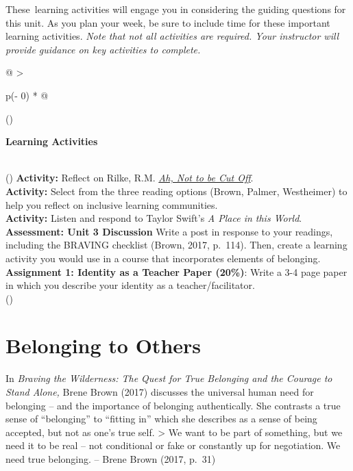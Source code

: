 \documentclass[
]{book}
\begin{document}
These~learning activities will engage you in considering the guiding questions for this unit. As you plan your week, be sure to include time for these important learning activities. \emph{Note that not all activities are required. Your instructor will provide guidance on key activities to complete.}

\begin{longtable}[]{@{}
  >{\raggedright\arraybackslash}p{(\columnwidth - 0\tabcolsep) * }@{}}
\toprule()
\begin{minipage}[b]{\linewidth}\raggedright
\textbf{Learning Activities}
\end{minipage} \\
\midrule()
\endhead
\textbf{Activity:} Reflect on Rilke, R.M. \emph{\href{https://gladdestthing.com/poems/ah-not-to-be-cut-off}{Ah, Not to be Cut Off}}. \\
\textbf{Activity:} Select from the three reading options (Brown, Palmer, Westheimer) to help you reflect on inclusive learning communities. \\
\textbf{Activity:} Listen and respond to Taylor Swift's \emph{A Place in this World}. \\
\textbf{Assessment: Unit 3 Discussion} Write a post in response to your readings, including the BRAVING checklist (Brown, 2017, p.~114). Then, create a learning activity you would use in a course that incorporates elements of belonging. \\
\textbf{Assignment 1: Identity as a Teacher Paper (20\%)}: Write a 3-4 page paper in which you describe your identity as a teacher/facilitator. \\
\bottomrule()
\end{longtable}

\hypertarget{belonging-to-others-1}{%
\section{Belonging to Others}\label{belonging-to-others-1}}

In \emph{Braving the Wilderness: The Quest for True Belonging and the Courage to Stand Alone,} Brene Brown (2017) discusses the universal human need for belonging -- and the importance of belonging authentically. She contrasts a true sense of ``belonging'' to ``fitting in'' which she describes as a sense of being accepted, but not as one's true self.
\textgreater{} We want to be part of something, but we need it to be real -- not conditional or fake or constantly up for negotiation. We need true belonging. -- Brene Brown (2017, p.~31)
\end{document}
